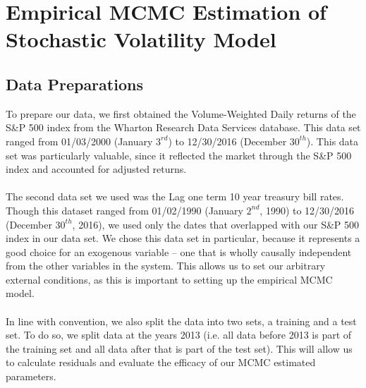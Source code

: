 \documentclass[letterpaper]{article}
\begin{document}
\newpage
\section{Empirical MCMC Estimation of Stochastic Volatility Model}
\subsection{Data Preparations}
To prepare our data, we first obtained the Volume-Weighted Daily returns of the S\&P 500 index from the Wharton Research Data Services database. This data set ranged from 01/03/2000 (January $3^{rd}$) to 12/30/2016 (December $30^{th}$). This data set was particularly valuable, since it reflected the market through the S\&P 500 index and accounted for adjusted returns.\\\\
The second data set we used was the Lag one term 10 year treasury bill rates. Though this dataset ranged from 01/02/1990 (January $2^{nd}$, 1990) to 12/30/2016 (December $30^{th}$, 2016), we used only the dates that overlapped with our S\&P 500 index in our data set. We chose this data set in particular, because it represents a good choice for an exogenous variable -- one that is wholly causally independent from the other variables in the system. This allows us to set our arbitrary external conditions, as this is important to setting up the empirical MCMC model. \\\\
In line with convention, we also split the data into two sets, a training and a test set. To do so, we split data at the years 2013 (i.e. all data before 2013 is part of the training set and all data after that is part of the test set). This will allow us to calculate residuals and evaluate the efficacy of our MCMC estimated parameters.
\end{document}
